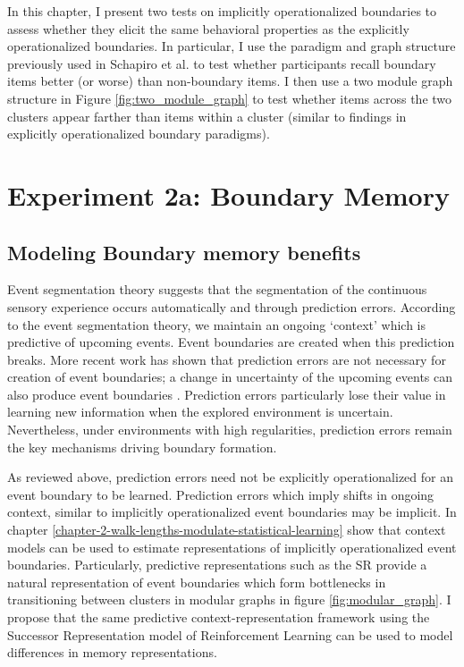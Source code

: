 In this chapter, I present two tests on implicitly operationalized boundaries to assess whether they elicit the same behavioral properties as the explicitly operationalized boundaries. In particular, I use the paradigm and graph structure previously used in Schapiro et al. \cite{schapiro2013neural} to test whether participants recall boundary items better (or worse) than non-boundary items. I then use a two module graph structure in Figure \ref{fig:two_module_graph} to test whether items across the two clusters appear farther than items within a cluster (similar to findings in explicitly operationalized boundary paradigms). 

\section{Experiment 2a: Boundary Memory}
\subsection*{Modeling Boundary memory benefits}
Event segmentation theory suggests that the segmentation of the continuous sensory experience occurs automatically and through prediction errors\cite{zacks2007event,zacks2007eventp, swallow2009event}. According to the event segmentation theory, we maintain an ongoing `context' which is predictive of upcoming events. Event boundaries are created when this prediction breaks. More recent work has shown that prediction errors are not necessary for creation of event boundaries; a change in uncertainty of the upcoming events can also produce event boundaries \cite{shin2021structuring}. Prediction errors particularly lose their value in learning new information when the explored environment is uncertain\cite{behrens2007learning}. Nevertheless, under environments with high regularities, prediction errors remain the key mechanisms driving boundary formation. 

As reviewed above, prediction errors need not be explicitly operationalized for an event boundary to be learned. Prediction errors which imply shifts in ongoing context, similar to implicitly operationalized event boundaries may be implicit. In chapter \ref{chapter-2-walk-lengths-modulate-statistical-learning} show that context models can be used to estimate representations of implicitly operationalized event boundaries. Particularly, predictive representations such as the SR provide a natural representation of event boundaries which form bottlenecks in transitioning between clusters in modular graphs in figure \ref{fig:modular_graph}. I propose that the same predictive context-representation framework using the Successor Representation model of Reinforcement Learning \cite{dayan1993improving, momennejad2017successor, russek2017predictive, momennejad2020learning,gershman2012successor} can be used to model differences in memory representations. 

